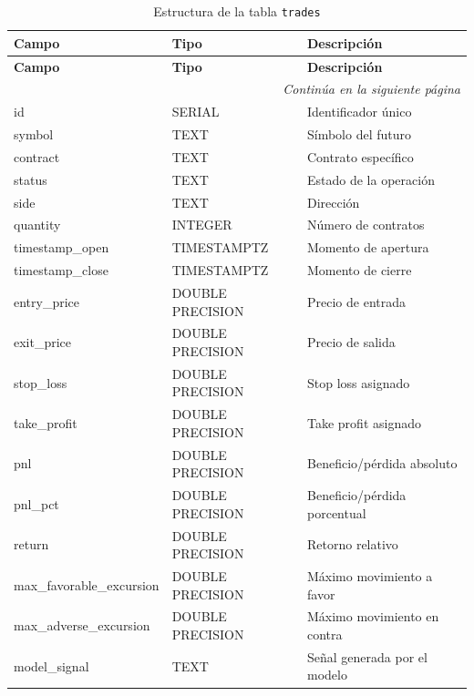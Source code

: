\begin{longtable}{l l l}
\caption{Estructura de la tabla \texttt{trades}} \\
\toprule
\textbf{Campo} & \textbf{Tipo} & \textbf{Descripción} \\
\midrule
\endfirsthead

\toprule
\textbf{Campo} & \textbf{Tipo} & \textbf{Descripción} \\
\midrule
\endhead

\midrule
\multicolumn{3}{r}{\textit{Continúa en la siguiente página}} \\
\midrule
\endfoot

\bottomrule
\endlastfoot

id                     & SERIAL            & Identificador único \\
symbol                 & TEXT              & Símbolo del futuro \\
contract               & TEXT              & Contrato específico\\
status                 & TEXT              & Estado de la operación\\
side                   & TEXT              & Dirección\\
quantity               & INTEGER           & Número de contratos \\
timestamp\_open        & TIMESTAMPTZ       & Momento de apertura \\
timestamp\_close       & TIMESTAMPTZ       & Momento de cierre\\
entry\_price           & DOUBLE PRECISION  & Precio de entrada \\
exit\_price            & DOUBLE PRECISION  & Precio de salida \\
stop\_loss             & DOUBLE PRECISION  & Stop loss asignado \\
take\_profit           & DOUBLE PRECISION  & Take profit asignado \\
pnl                    & DOUBLE PRECISION  & Beneficio/pérdida absoluto \\
pnl\_pct               & DOUBLE PRECISION  & Beneficio/pérdida porcentual \\
return                 & DOUBLE PRECISION  & Retorno relativo \\
max\_favorable\_excursion & DOUBLE PRECISION & Máximo movimiento a favor \\
max\_adverse\_excursion   & DOUBLE PRECISION & Máximo movimiento en contra \\
model\_signal          & TEXT              & Señal generada por el modelo \\

\end{longtable}
